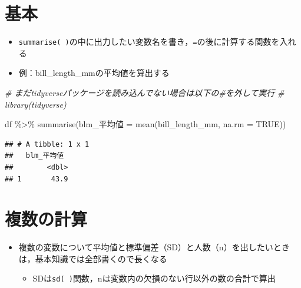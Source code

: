 \documentclass[
  xelatex,ja=standard, b5paper]{bxjsbook}
\newenvironment{Shaded}{\begin{snugshade}}{\end{snugshade}}
\newcommand{\AttributeTok}[1]{\textcolor[rgb]{0.77,0.63,0.00}{#1}}
\newcommand{\CommentTok}[1]{\textcolor[rgb]{0.56,0.35,0.01}{\textit{#1}}}
\newcommand{\ConstantTok}[1]{\textcolor[rgb]{0.00,0.00,0.00}{#1}}
\newcommand{\FunctionTok}[1]{\textcolor[rgb]{0.00,0.00,0.00}{#1}}
\newcommand{\NormalTok}[1]{#1}
\newcommand{\OtherTok}[1]{\textcolor[rgb]{0.56,0.35,0.01}{#1}}
\newcommand{\SpecialCharTok}[1]{\textcolor[rgb]{0.00,0.00,0.00}{#1}}
\providecommand{\tightlist}{%
  \setlength{\itemsep}{0pt}\setlength{\parskip}{0pt}}
\begin{document}
\hypertarget{su-st}{%
\section{基本}\label{su-st}}

\begin{itemize}
\tightlist
\item
  \texttt{summarise(\ )}の中に出力したい変数名を書き，\texttt{=}の後に計算する関数を入れる
\item
  例：bill\_length\_mmの平均値を算出する
\end{itemize}

\begin{Shaded}
\begin{Highlighting}[]
\CommentTok{\# まだtidyverseパッケージを読み込んでない場合は以下の\#を外して実行}
\CommentTok{\# library(tidyverse)}

\NormalTok{df }\SpecialCharTok{\%\textgreater{}\%} 
  \FunctionTok{summarise}\NormalTok{(blm\_平均値 }\OtherTok{=} \FunctionTok{mean}\NormalTok{(bill\_length\_mm, }\AttributeTok{na.rm =} \ConstantTok{TRUE}\NormalTok{))}
\end{Highlighting}
\end{Shaded}

\begin{verbatim}
## # A tibble: 1 x 1
##   blm_平均値
##        <dbl>
## 1       43.9
\end{verbatim}

\hypertarget{su-st-multiple}{%
\section{複数の計算}\label{su-st-multiple}}

\begin{itemize}
\tightlist
\item
  複数の変数について平均値と標準偏差（SD）と人数（n）を出したいときは，基本知識では全部書くので長くなる

  \begin{itemize}
  \tightlist
  \item
    SDは\texttt{sd(\ )}関数，nは変数内の欠損のない行以外の数の合計で算出
  \end{itemize}
\end{itemize}
\end{document}
